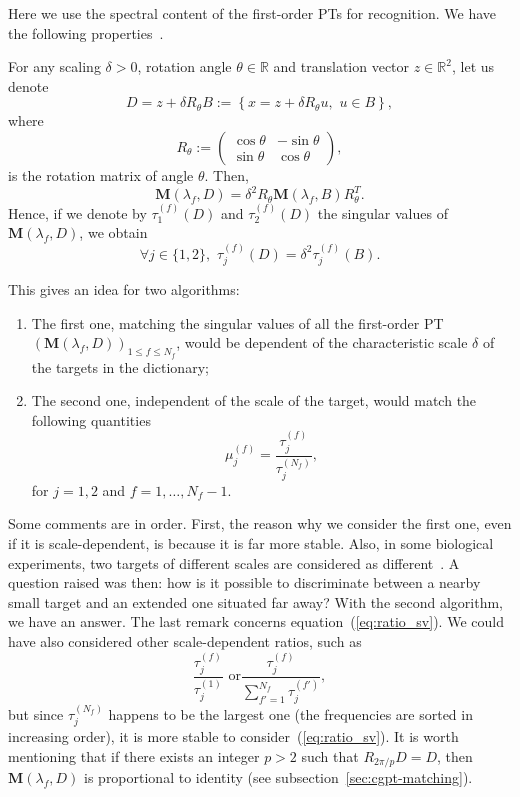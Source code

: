 Here  we use the spectral content of the first-order PTs for
recognition. We have the following
properties~\cite{ammari2007polarization}.
\begin{proposition}
For any scaling $\delta>0$, rotation angle $\theta\in\mathbb{R}$
and translation vector $z\in\mathbb{R}^{2}$, let us denote
\[
D= z+\delta R_{\theta} B:=\left\{ x=z+\delta R_{\theta}u,\,\, u\in
B\right\} ,
\]
where
\[
R_{\theta}:=\left(\begin{array}{cc}
\cos\theta & -\sin\theta\\
\sin\theta & \cos\theta
\end{array}\right),
\]
is the rotation matrix of angle $\theta$. Then,
\begin{equation} \label{eqrota}
\mathbf{M}(\lambda_f,D)=\delta^{2}R_{\theta}\mathbf{M}(\lambda_f,B) R_{\theta}^{T}.
\end{equation}
Hence, if we denote by $\tau_{1}^{(f)}(D)$ and $\tau_{2}^{(f)}(D)$
the singular values of $\mathbf{M}(\lambda_f,D)$, we obtain
\[
\forall
j\in\{1,2\},\,\,\tau_{j}^{(f)}(D)=\delta^{2}\tau_{j}^{(f)}(B).
\]

\end{proposition}
This gives an idea for two algorithms:
\begin{enumerate}
\item The first one, matching the singular values of all the
first-order PT $\left(\mathbf{M}(\lambda_f,D)\right)_{1\leq f\leq N_f}$,
would be dependent of the characteristic scale $\delta$ of the
targets in the dictionary; \item The second one, independent of
the scale of the target, would match the following quantities
\begin{equation}
\mu_{j}^{(f)}=\frac{\tau_{j}^{(f)}}{\tau_{j}^{(N_f)}},\label{eq:ratio_sv}
\end{equation}
for $j=1,2$ and $f=1,\ldots,N_f-1$.
\end{enumerate}
Some comments are in order. First, the reason why we consider the
first one, even if it is scale-dependent, is because it is far
more stable. Also, in some biological experiments, two targets of
different scales are considered as
different~\cite{von2007distance}. A question raised was then: how
is it possible to discriminate between a nearby small target and
an extended one situated far away? With the second algorithm, we
have an answer. The last remark concerns
equation~(\ref{eq:ratio_sv}). We could have also considered other
scale-dependent ratios, such as
\[
\frac{\tau_{j}^{(f)}}{\tau_{j}^{(1)}}\mbox{ or
}\frac{\tau_{j}^{(f)}}{\sum_{f'=1}^{N_f}\tau_{j}^{(f')}},
\]
but since $\tau_{j}^{(N_f)}$ happens to be the largest one (the
frequencies are sorted in increasing order), it is more stable to
consider~(\ref{eq:ratio_sv}). It is worth mentioning that if there
exists an integer $p>2$ such that $R_{2\pi/p} D = D$, then
$\mathbf{M}(\lambda_f,D)$ is proportional to identity (see subsection~\ref{sec:cgpt-matching}).





